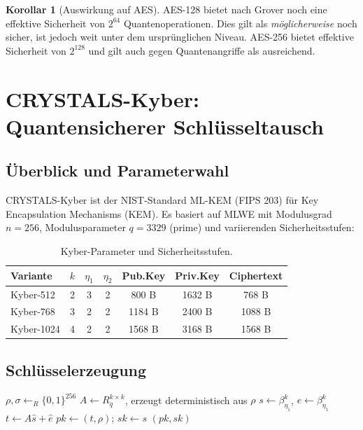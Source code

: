 ﻿\documentclass[a4paper,12pt]{article}
\theoremstyle{definition}
\newtheorem{korollar}{Korollar}[section]
\begin{document}
\begin{korollar}[Auswirkung auf AES]
AES-128 bietet nach Grover noch eine effektive Sicherheit von $2^{64}$ Quantenoperationen.
Dies gilt als \emph{möglicherweise} noch sicher, ist jedoch weit unter dem
ursprünglichen Niveau. AES-256 bietet effektive Sicherheit von $2^{128}$
und gilt auch gegen Quantenangriffe als ausreichend.
\end{korollar}

\section{CRYSTALS-Kyber: Quantensicherer Schlüsseltausch}

\subsection{Überblick und Parameterwahl}

CRYSTALS-Kyber \cite{ABD+22} ist der NIST-Standard ML-KEM (FIPS 203) für
Key Encapsulation Mechanisms (KEM). Es basiert auf MLWE mit Modulusgrad $n = 256$,
Modulusparameter $q = 3329$ (prime) und variierenden Sicherheitsstufen:

\begin{table}[H]
\centering
\caption{Kyber-Parameter und Sicherheitsstufen.}
\label{tab:kyber}
\begin{tabular}{lcccccc}
\toprule
Variante & $k$ & $\eta_1$ & $\eta_2$ & Pub.Key & Priv.Key & Ciphertext\\
\midrule
Kyber-512  & 2 & 3 & 2 & 800 B & 1632 B & 768 B \\
Kyber-768  & 3 & 2 & 2 & 1184 B & 2400 B & 1088 B \\
Kyber-1024 & 4 & 2 & 2 & 1568 B & 3168 B & 1568 B \\
\bottomrule
\end{tabular}
\end{table}

\subsection{Schlüsselerzeugung}

\begin{algorithm}[H]
\caption{Kyber.KeyGen()}
\label{alg:kyberkeygen}
\begin{algorithmic}[1]
\State $\rho, \sigma \leftarrow_R \{0,1\}^{256}$
\State $A \leftarrow R_q^{k \times k}$, erzeugt deterministisch aus $\rho$
\State $s \leftarrow \beta_{\eta_1}^k$, $e \leftarrow \beta_{\eta_1}^k$
\State $t \leftarrow A \hat{s} + \hat{e}$
\State $pk \leftarrow (t, \rho)$; $sk \leftarrow s$
\State \Return $(pk, sk)$
\end{algorithmic}
\end{algorithm}
\end{document}
